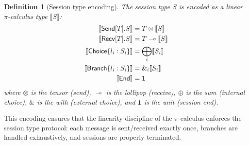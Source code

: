 \documentclass[11pt,a4paper]{article}
\newtheorem{definition}[theorem]{Definition}
\begin{document}
\begin{definition}[Session type encoding]\label{def:session-encoding}
The session type $S$ is encoded as a linear $\pi$-calculus type $\llbracket S \rrbracket$:
\begin{align}
\llbracket \mathsf{Send}[T].S \rrbracket &= T \otimes \llbracket S \rrbracket \notag \\
\llbracket \mathsf{Recv}[T].S \rrbracket &= T \multimap \llbracket S \rrbracket \notag \\
\llbracket \mathsf{Choice}\{l_i : S_i\} \rrbracket &= \bigoplus_{i} \llbracket S_i \rrbracket \notag \\
\llbracket \mathsf{Branch}\{l_i : S_i\} \rrbracket &= \&_{i} \llbracket S_i \rrbracket \notag \\
\llbracket \mathsf{End} \rrbracket &= \mathbf{1} \notag
\end{align}
where $\otimes$ is the tensor (send), $\multimap$ is the lollipop (receive), $\oplus$ is the sum (internal choice), $\&$ is the with (external choice), and $\mathbf{1}$ is the unit (session end).
\end{definition}

This encoding ensures that the linearity discipline of the $\pi$-calculus enforces the session type protocol: each message is sent/received exactly once, branches are handled exhaustively, and sessions are properly terminated.
\end{document}
